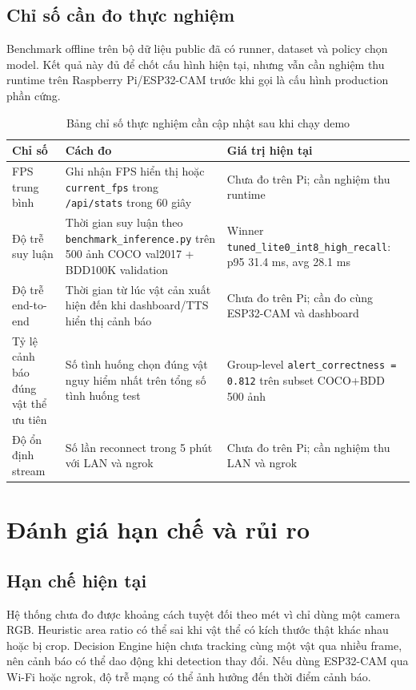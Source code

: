 \documentclass[oneside,final]{hcmut-report}
\begin{document}
\subsection{Chỉ số cần đo thực nghiệm}
Benchmark offline trên bộ dữ liệu public đã có runner, dataset và policy chọn model. Kết quả này đủ để chốt cấu hình hiện tại, nhưng vẫn cần nghiệm thu runtime trên Raspberry Pi/ESP32-CAM trước khi gọi là cấu hình production phần cứng.
\begin{table}[H]
  \centering
  \caption{Bảng chỉ số thực nghiệm cần cập nhật sau khi chạy demo}
  \label{tab:metrics}
  \begin{tabularx}{\textwidth}{L{4.0cm}Y L{3.0cm}}
    \toprule
    \textbf{Chỉ số} & \textbf{Cách đo} & \textbf{Giá trị hiện tại} \\
    \midrule
    FPS trung bình & Ghi nhận FPS hiển thị hoặc \texttt{current\_fps} trong \texttt{/api/stats} trong 60 giây & Chưa đo trên Pi; cần nghiệm thu runtime \\
    Độ trễ suy luận & Thời gian suy luận theo \texttt{benchmark\_inference.py} trên 500 ảnh COCO val2017 + BDD100K validation & Winner \texttt{tuned\_lite0\_int8\_high\_recall}: p95 31.4 ms, avg 28.1 ms \\
    Độ trễ end-to-end & Thời gian từ lúc vật cản xuất hiện đến khi dashboard/TTS hiển thị cảnh báo & Chưa đo trên Pi; cần đo cùng ESP32-CAM và dashboard \\
    Tỷ lệ cảnh báo đúng vật thể ưu tiên & Số tình huống chọn đúng vật nguy hiểm nhất trên tổng số tình huống test & Group-level \texttt{alert\_correctness = 0.812} trên subset COCO+BDD 500 ảnh \\
    Độ ổn định stream & Số lần reconnect trong 5 phút với LAN và ngrok & Chưa đo trên Pi; cần nghiệm thu LAN và ngrok \\
    \bottomrule
  \end{tabularx}
\end{table}

\section{Đánh giá hạn chế và rủi ro}

\subsection{Hạn chế hiện tại}
Hệ thống chưa đo được khoảng cách tuyệt đối theo mét vì chỉ dùng một camera RGB. Heuristic area ratio có thể sai khi vật thể có kích thước thật khác nhau hoặc bị crop. Decision Engine hiện chưa tracking cùng một vật qua nhiều frame, nên cảnh báo có thể dao động khi detection thay đổi. Nếu dùng ESP32-CAM qua Wi-Fi hoặc ngrok, độ trễ mạng có thể ảnh hưởng đến thời điểm cảnh báo.
\end{document}
